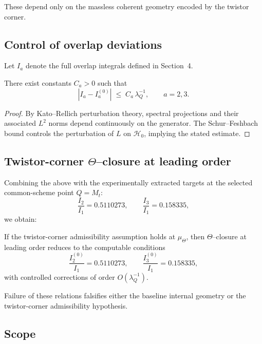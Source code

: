 \documentclass[11pt]{article}
\begin{document}
These depend only on the massless coherent geometry encoded by the twistor
corner.

\subsection{Control of overlap deviations}

Let $I_a$ denote the full overlap integrals defined in Section~4.

\begin{lemma}
There exist constants $C_a>0$ such that
\[
|I_a - I_a^{(0)}| \;\le\; C_a\,\lambda_Q^{-1},
\qquad a=2,3.
\]
\end{lemma}

\begin{proof}
By Kato--Rellich perturbation theory, spectral projections and their
associated $L^2$ norms depend continuously on the generator.
The Schur--Feshbach bound controls the perturbation of $L$ on $\mathcal H_0$,
implying the stated estimate.
\end{proof}

\subsection{Twistor-corner $\Theta$--closure at leading order}

Combining the above with the experimentally extracted targets at the selected common-scheme point $Q=M_t$:
\[
\frac{I_2}{I_1} = 0.5110273,
\qquad
\frac{I_3}{I_1} = 0.158335,
\]
we obtain:

\begin{theorem}
If the twistor-corner admissibility assumption holds at $\mu_\Theta$, then
$\Theta$--closure at leading order reduces to the computable conditions
\[
\frac{I_2^{(0)}}{I_1} = 0.5110273,
\qquad
\frac{I_3^{(0)}}{I_1} = 0.158335,
\]
with controlled corrections of order $O(\lambda_Q^{-1})$.
\end{theorem}

\begin{remark}
Failure of these relations falsifies either the baseline internal geometry
or the twistor-corner admissibility hypothesis.
\end{remark}

\subsection{Scope}
\end{document}
